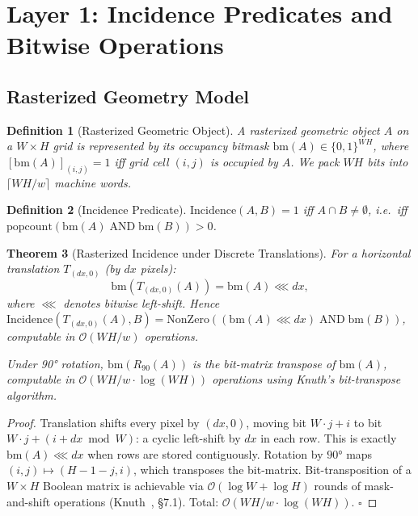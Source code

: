 \documentclass[11pt,letterpaper]{article}
\newtheorem{theorem}{Theorem}[section]
\newtheorem{definition}[theorem]{Definition}
\newcommand{\cO}{\mathcal{O}}
\newcommand{\wt}{w}       %
\DeclareMathOperator{\AND}{AND}
\begin{document}
\section{Layer 1: Incidence Predicates and Bitwise Operations}\label{sec:layer1}

\subsection{Rasterized Geometry Model}

\begin{definition}[Rasterized Geometric Object]
A \emph{rasterized geometric object} $A$ on a $W\times H$ grid is represented by its
\emph{occupancy bitmask} $\mathrm{bm}(A)\in\{0,1\}^{WH}$, where
$[\mathrm{bm}(A)]_{(i,j)}=1$ iff grid cell $(i,j)$ is occupied by $A$.  We pack $WH$
bits into $\lceil WH/\wt\rceil$ machine words.
\end{definition}

\begin{definition}[Incidence Predicate]
$\mathrm{Incidence}(A,B)=1$ iff $A\cap B\ne\emptyset$, i.e.\ iff
$\mathrm{popcount}(\mathrm{bm}(A)\AND\mathrm{bm}(B))>0$.
\end{definition}

\begin{theorem}[Rasterized Incidence under Discrete Translations]\label{thm:incidence}
For a horizontal translation $T_{(dx,0)}$ (by $dx$ pixels):
\begin{equation}
  \mathrm{bm}(T_{(dx,0)}(A)) = \mathrm{bm}(A)\lll dx,
\end{equation}
where $\lll$ denotes bitwise left-shift.  Hence
$\mathrm{Incidence}(T_{(dx,0)}(A),B) = \mathrm{NonZero}((\mathrm{bm}(A)\lll dx)\AND\mathrm{bm}(B))$,
computable in $\cO(WH/\wt)$ operations.

Under 90° rotation, $\mathrm{bm}(R_{90}(A))$ is the \emph{bit-matrix transpose} of
$\mathrm{bm}(A)$, computable in $\cO(WH/\wt\cdot\log(WH))$ operations using
Knuth's bit-transpose algorithm.
\end{theorem}

\begin{proof}
Translation shifts every pixel by $(dx,0)$, moving bit $W\cdot j+i$ to bit
$W\cdot j+(i+dx\bmod W)$: a cyclic left-shift by $dx$ in each row.  This is exactly
$\mathrm{bm}(A)\lll dx$ when rows are stored contiguously.  Rotation by $90°$ maps
$(i,j)\mapsto(H-1-j,i)$, which transposes the bit-matrix.  Bit-transposition of a
$W\times H$ Boolean matrix is achievable via $\cO(\log W+\log H)$ rounds of
mask-and-shift operations (Knuth~\cite{Knuth11}, \S7.1).  Total: $\cO(WH/\wt\cdot\log(WH))$.
$\square$
\end{proof}
\end{document}
